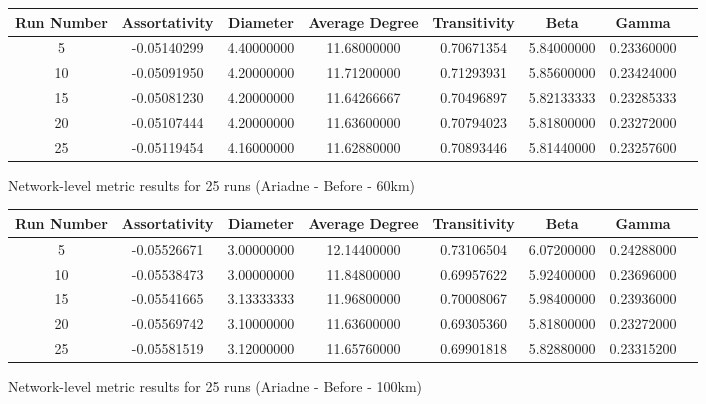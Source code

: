 \documentclass[12pt,a4paper]{thesis}
\begin{document}
{\begin{appendices}
\begin{figure}
\centering
\tiny
\begin{tabular}{|c|c|c|c|c|c|c|c|}
\hline Run Number & Assortativity & Diameter & Average Degree & Transitivity & Beta & Gamma \\ 
\hline	5	&	-0.05140299	&	4.40000000	&	11.68000000	&	0.70671354	&	5.84000000	&	0.23360000	\\
\hline	10	&	-0.05091950	&	4.20000000	&	11.71200000	&	0.71293931	&	5.85600000	&	0.23424000	\\
\hline	15	&	-0.05081230	&	4.20000000	&	11.64266667	&	0.70496897	&	5.82133333	&	0.23285333	\\
\hline	20	&	-0.05107444	&	4.20000000	&	11.63600000	&	0.70794023	&	5.81800000	&	0.23272000	\\
\hline	25	&	-0.05119454	&	4.16000000	&	11.62880000	&	0.70893446	&	5.81440000	&	0.23257600	\\ 
\hline 
\end{tabular}
\caption{Network-level metric results for 25 runs (Ariadne - Before - 60km)}
\label{fig:ConvergeAriadneB60} 
\end{figure}

\begin{figure}
\centering
\tiny
\begin{tabular}{|c|c|c|c|c|c|c|c|}
\hline Run Number & Assortativity & Diameter & Average Degree & Transitivity & Beta & Gamma \\ 
\hline	5	&	-0.05526671	&	3.00000000	&	12.14400000	&	0.73106504	&	6.07200000	&	0.24288000	\\
\hline	10	&	-0.05538473	&	3.00000000	&	11.84800000	&	0.69957622	&	5.92400000	&	0.23696000	\\
\hline	15	&	-0.05541665	&	3.13333333	&	11.96800000	&	0.70008067	&	5.98400000	&	0.23936000	\\
\hline	20	&	-0.05569742	&	3.10000000	&	11.63600000	&	0.69305360	&	5.81800000	&	0.23272000	\\
\hline	25	&	-0.05581519	&	3.12000000	&	11.65760000	&	0.69901818	&	5.82880000	&	0.23315200	\\
\hline 
\end{tabular}
\caption{Network-level metric results for 25 runs (Ariadne - Before - 100km)}
\label{fig:ConvergeAriadneB100} 
\end{figure}


\end{appendices}}
\end{document}
